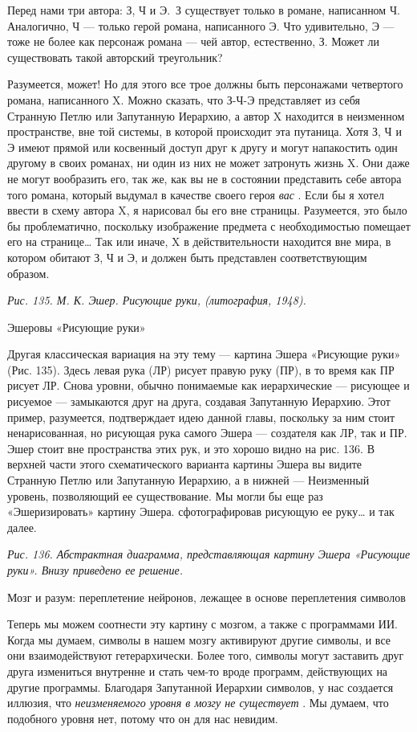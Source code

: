 Перед нами три автора: З, Ч и Э.~З существует только в романе, написанном Ч. Аналогично, Ч --- только герой романа, написанного Э. Что удивительно, Э --- тоже не более как персонаж романа --- чей автор, естественно, З. Может ли существовать такой авторский треугольник?

Разумеется, может! Но для этого все трое должны быть персонажами четвертого романа, написанного X. Можно сказать, что З-Ч-Э представляет из себя Странную Петлю или Запутанную Иерархию, а автор X находится в неизменном пространстве, вне той системы, в которой происходит эта путаница. Хотя З, Ч и Э имеют прямой или косвенный доступ друг к другу и могут напакостить один другому в своих романах, ни один из них не может затронуть жизнь X. Они даже не могут вообразить его, так же, как вы не в состоянии представить себе автора того романа, который выдумал в качестве своего героя \emph{вас} . Если бы я хотел ввести в схему автора X, я нарисовал бы его вне страницы. Разумеется, это было бы проблематично, поскольку изображение предмета с необходимостью помещает его на странице\ldots{} Так или иначе, X в действительности находится вне мира, в котором обитают З, Ч и Э, и должен быть представлен соответствующим образом.

\emph{Рис. 135. М. К. Эшер. Рисующие руки, (литография, 1948).}

Эшеровы «Рисующие руки»

Другая классическая вариация на эту тему --- картина Эшера «Рисующие руки» (Рис. 135). Здесь левая рука (ЛР) рисует правую руку (ПР), в то время как ПР рисует ЛР. Снова уровни, обычно понимаемые как иерархические --- рисующее и рисуемое --- замыкаются друг на друга, создавая Запутанную Иерархию. Этот пример, разумеется, подтверждает идею данной главы, поскольку за ним стоит ненарисованная, но рисующая рука самого Эшера --- создателя как ЛР, так и ПР. Эшер стоит вне пространства этих рук, и это хорошо видно на рис. 136. В верхней части этого схематического варианта картины Эшера вы видите Странную Петлю или Запутанную Иерархию, а в нижней --- Неизменный уровень, позволяющий ее существование. Мы могли бы еще раз «Эшеризировать» картину Эшера. сфотографировав рисующую ее руку\ldots{} и так далее.

\emph{Рис. 136. Абстрактная диаграмма, представляющая картину Эшера «Рисующие руки». Внизу приведено ее решение.}

Мозг и разум: переплетение нейронов, лежащее в основе переплетения символов

Теперь мы можем соотнести эту картину с мозгом, а также с программами ИИ. Когда мы думаем, символы в нашем мозгу активируют другие символы, и все они взаимодействуют гетерархически. Более того, символы могут заставить друг друга измениться внутренне и стать чем-то вроде программ, действующих на другие программы. Благодаря Запутанной Иерархии символов, у нас создается иллюзия, что \emph{неизменяемого уровня в мозгу не существует} . Мы думаем, что подобного уровня нет, потому что он для нас невидим.

